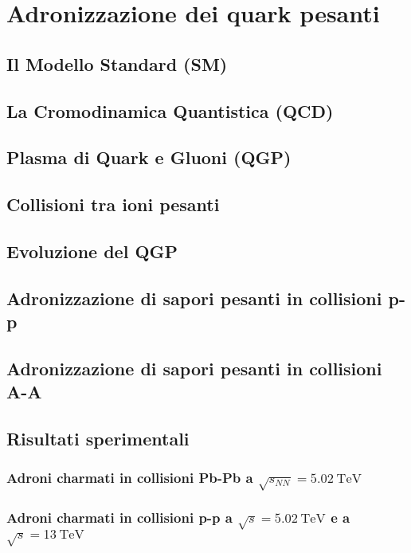 \chapter{Adronizzazione dei quark pesanti}

\section{Il Modello Standard (SM)}

\section{La Cromodinamica Quantistica (QCD)}

\section{Plasma di Quark e Gluoni (QGP)}

\section{Collisioni tra ioni pesanti}

\section{Evoluzione del QGP}

\section{Adronizzazione di sapori pesanti in collisioni p-p}

\section{Adronizzazione di sapori pesanti in collisioni A-A}

\section{Risultati sperimentali}

\subsection{Adroni charmati in collisioni Pb-Pb a $\sqrt{s_{NN}} = \qty{5.02}{\tera \eV}$}

\subsection{Adroni charmati in collisioni p-p a $\sqrt{s} = \qty{5.02}{\tera \eV}$ e a \\ $\sqrt{s} = \qty{13}{\tera \eV}$}